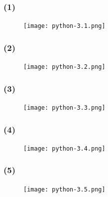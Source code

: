 \documentclass{beamer}
\begin{document}
  \begin{frame}[fragile]
    \frametitle{(1)}
    \begin{figure}[!htb] %
      \texttt{[image: python-3.1.png]} %
    \end{figure}
  \end{frame}
  \begin{frame}[fragile]
    \frametitle{(2)}
    \begin{figure}[!htb] %
      \texttt{[image: python-3.2.png]} %
    \end{figure}
  \end{frame}
  \begin{frame}[fragile]
    \frametitle{(3)}
    \begin{figure}[!htb] %
      \texttt{[image: python-3.3.png]} %
    \end{figure}
  \end{frame}
  \begin{frame}[fragile]
    \frametitle{(4)}
    \begin{figure}[!htb] %
      \texttt{[image: python-3.4.png]} %
    \end{figure}
  \end{frame}
  \begin{frame}[fragile]
    \frametitle{(5)}
    \begin{figure}[!htb] %
      \texttt{[image: python-3.5.png]} %
    \end{figure}
  \end{frame}
\end{document}
